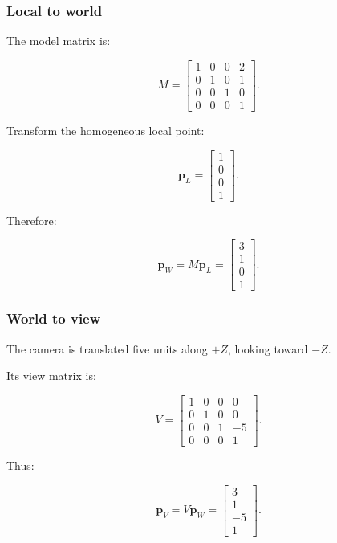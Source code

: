\subsubsection{Local to world}\label{02-foundations-ii-ch037-local-to-world}

\hypertarget{02-foundations-ii-ch037-local-to-world}{}

The model matrix is:

\[
 M= \begin{bmatrix} 1&0&0&2\\ 0&1&0&1\\ 0&0&1&0\\ 0&0&0&1 \end{bmatrix}.
\]

Transform the homogeneous local point:

\[
 \mathbf p_L= \begin{bmatrix} 1\\0\\0\\1 \end{bmatrix}.
\]

Therefore:

\[
 \boxed{ \mathbf p_W= M\mathbf p_L= \begin{bmatrix} 3\\1\\0\\1 \end{bmatrix} }.
\]

\subsubsection{World to view}\label{02-foundations-ii-ch037-world-to-view}

\hypertarget{02-foundations-ii-ch037-world-to-view}{}

The camera is translated five units along \(+Z\), looking toward \(-Z\).

Its view matrix is:

\[
 V= \begin{bmatrix} 1&0&0&0\\ 0&1&0&0\\ 0&0&1&-5\\ 0&0&0&1 \end{bmatrix}.
\]

Thus:

\[
 \boxed{ \mathbf p_V= V\mathbf p_W= \begin{bmatrix} 3\\1\\-5\\1 \end{bmatrix} }.
\]

